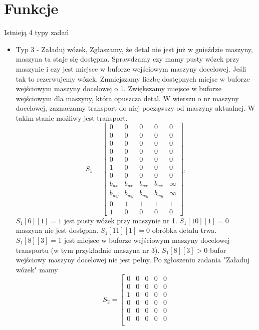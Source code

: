 \documentclass[10pt, a4paper]{article}
\begin{document}
\section{Funkcje}
Istnieją 4 typy zadań
\begin{itemize}

\item Typ 3 - Załaduj wózek,
Zgłaszamy, że detal nie jest już w gnieździe maszyny, maszyna ta staje się dostępna. Sprawdzamy czy mamy pusty wózek przy maszynie i czy jest miejsce w buforze wejściowym maszyny docelowej. Jeśli tak to rezerwujemy wózek. Zmniejszamy liczbę dostępnych miejsc w buforze wejściowym maszyny docelowej o 1. Zwiększamy miejsce w buforze wejściowym dla maszyny, która opuszcza detal. W wierszu o nr maszyny docelowej, zaznaczamy transport do niej począwszy od maszyny aktualnej. W takim stanie możliwy jest transport.
\begin{equation}
S_1=\left[\begin{array}{ccccc}
0 & 0 & 0 & 0&0\\
0 & 0 & 0 & 0 & 0\\
0 & 0 & 0 & 0& 0\\
0 & 0 & 0 & 0& 0\\
0 & 0 & 0 & 0& 0\\
1 & 0 & 0 & 0 & 0\\
0 & 0 & 0 & 0& 0\\
b_{we}& b_{we}& b_{we}& b_{we} & \infty\\
b_{wy}& b_{wy}& b_{wy}& b_{wy} & \infty\\
0& 1& 1& 1 & 1\\
1 & 0 & 0 & 0 & 0
\end{array}\right],
\end{equation}
$S_1[6][1]=1$ jest pusty wózek przy maszynie nr 1. $S_1[10][1]=0$ maszyna nie jest dostępna. $S_1[11][1]=0$ obróbka detalu trwa. $S_1[8][3]=1$ jest miejsce w buforze wejściowym maszyny docelowej transportu (w tym przykładnie maszyna nr 3). $S_1[8][3]>0$ bufor wejściowy maszyny docelowej nie jest pełny. Po zgłoszeniu zadania "Załaduj wózek" mamy
\begin{equation}
S_2=\left[\begin{array}{ccccc}
0 & 0 & 0 & 0&0\\
0 & 0 & 0 & 0 & 0\\
1 & 0 & 0 & 0& 0\\
0 & 0 & 0 & 0& 0\\
0 & 0 & 0 & 0& 0\\
0 & 0 & 0 & 0 & 0\\

\end{array}
\end{equation}
\end{itemize}
\end{document}
